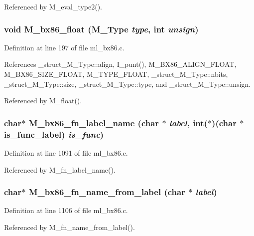 Referenced by M\_\-eval\_\-type2().
\subsubsection{\setlength{\rightskip}{0pt plus 5cm}void M\_\-bx86\_\-float (\bf{M\_\-Type} {\em type}, int {\em unsign})}\label{ml__bx86_8c_2fa536e8b323a4e8e649f7e998151b34}




Definition at line 197 of file ml\_\-bx86.c.

References \_\-struct\_\-M\_\-Type::align, I\_\-punt(), M\_\-BX86\_\-ALIGN\_\-FLOAT, M\_\-BX86\_\-SIZE\_\-FLOAT, M\_\-TYPE\_\-FLOAT, \_\-struct\_\-M\_\-Type::nbits, \_\-struct\_\-M\_\-Type::size, \_\-struct\_\-M\_\-Type::type, and \_\-struct\_\-M\_\-Type::unsign.

Referenced by M\_\-float().
\subsubsection{\setlength{\rightskip}{0pt plus 5cm}char$\ast$ M\_\-bx86\_\-fn\_\-label\_\-name (char $\ast$ {\em label}, int($\ast$)(char $\ast$is\_\-func\_\-label) {\em is\_\-func})}\label{ml__bx86_8c_c9d91fe91085f54571271645c4a0fc50}




Definition at line 1091 of file ml\_\-bx86.c.

Referenced by M\_\-fn\_\-label\_\-name().
\subsubsection{\setlength{\rightskip}{0pt plus 5cm}char$\ast$ M\_\-bx86\_\-fn\_\-name\_\-from\_\-label (char $\ast$ {\em label})}\label{ml__bx86_8c_4ac7df30459f8683618d00a724f44c74}




Definition at line 1106 of file ml\_\-bx86.c.

Referenced by M\_\-fn\_\-name\_\-from\_\-label().
